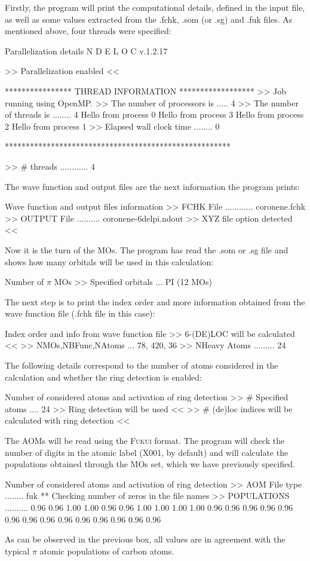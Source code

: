 \documentclass[a4paper,11pt,openany]{memoir}
\begin{document}
Firstly, the program will print the computational details, defined in the input file, as well as some values extracted from the .fchk, .som (or .sg) and .fuk files. As mentioned above, four threads were specified:
\begin{recuadro}{Parallelization details}
N D E L O C  v.1.2.17

>> Parallelization enabled <<

**************** THREAD INFORMATION ******************
>> Job running using OpenMP.
>> The number of processors is .....   4
>> The number of threads is ........   4
Hello from process       0
Hello from process       3
Hello from process       2
Hello from process       1
>> Elapsed wall clock time ........          0

******************************************************

>> # threads ............ 4
\end{recuadro}
The wave function and output files are the next information the program prints:
\begin{recuadro}{Wave function and output files information}
>> FCHK File ............ coronene.fchk
>> OUTPUT File .......... coronene-6delpi.ndout
>> XYZ file option detected <<
\end{recuadro}
Now it is the turn of the \acp{MO}. The program has read the .som or .sg file and shows how many orbitals will be used in this calculation:
\begin{recuadro}{Number of $\pi$ \acp{MO}}
>> Specified orbitals ... PI (12 MOs)
\end{recuadro}
The next step is to print the index order and more information obtained from the wave function file (.fchk file in this case):
\begin{recuadro}{Index order and info from wave function file}
>> 6-(DE)LOC will be calculated <<
>> NMOs,NBFunc,NAtoms ... 78, 420, 36
>> NHeavy Atoms ......... 24
\end{recuadro}
The following details correspond to the number of atoms considered in the calculation and whether the ring detection is enabled:
\begin{recuadro}{Number of considered atoms and activation of ring detection}
>> # Specified atoms .... 24
>> Ring detection will be used <<
>> # (de)loc indices will be calculated with ring detection <<
\end{recuadro}
The \acfp{AOM} will be read using the \textsc{Fukui} format. The program will check the number of digits in the atomic label (X001, by default) and will calculate the populations obtained through the \acp{MO} set, which we have previously specified.
\begin{recuadro}{Number of considered atoms and activation of ring detection}
>> AOM File type ........ fuk
** Checking number of zeros in the file names
>> POPULATIONS .......... 0.96 0.96 1.00 1.00 0.96 0.96 1.00 1.00 1.00 1.00 0.96
                          0.96 0.96 0.96 0.96 0.96 0.96 0.96 0.96 0.96 0.96 0.96
                          0.96 0.96
\end{recuadro}
As can be observed in the previous box, all values are in agreement with the typical $\pi$ atomic populations of carbon atoms.
\end{document}
